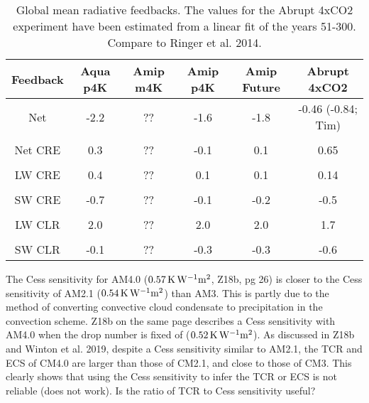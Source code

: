 \documentclass[11pt]{article}   	%
\begin{document}
\begin{table}
\begin{center}
\caption{Global mean radiative feedbacks.  The values for the Abrupt 4xCO2 experiment
have been estimated from a linear fit of the years 51-300.  Compare to Ringer et al. 2014.}
    \begin{tabular}{*{6}{c}}
    \hline
    \hline
 Feedback & Aqua p4K & Amip m4K & Amip p4K & Amip Future & Abrupt 4xCO2    \\ \hline
    Net          &   -2.2  & ??  &  -1.6              & -1.8           &    -0.46 (-0.84; Tim)         \\ 
    \\
    Net CRE      & 0.3   & ??  & -0.1            & 0.1           & 0.65   \\  
    \\
    LW CRE       & 0.4   & ??  & 0.1            & 0.1           & 0.14    \\  
    \\
    SW CRE      & -0.7  & ?? & -0.1          & -0.2          & -0.5              \\  
    \\
    LW CLR       & 2.0   & ?? & 2.0             & 2.0           & 1.7             \\  
    \\
    SW CLR      & -0.1  & ?? & -0.3            & -0.3          & -0.6                   \\  \hline

    \end{tabular}\par
    \label{tab:lambda}
\end{center}
\end{table}

The Cess sensitivity for AM4.0 ($0.57 \, \rm{K\, W^{-1} m^2}$, Z18b, pg 26) is closer to the Cess sensitivity 
of AM2.1 ($0.54 \, \rm{K\, W^{-1} m^2}$) than AM3.  This is partly due to the method of converting convective cloud condensate to precipitation 
in the convection scheme.   Z18b on the same page describes a Cess sensitivity with AM4.0 when the drop number
is fixed of ($0.52 \, \rm{K\, W^{-1} m^2}$).  As discussed in Z18b and Winton et al. 2019, despite a Cess sensitivity similar to AM2.1, 
the TCR and ECS of CM4.0 are larger than those of CM2.1, and close to those of CM3.   This clearly 
shows that using the Cess sensitivity to infer the TCR or ECS is not reliable (does not work).   Is the ratio of TCR to
Cess sensitivity useful?  
\end{document}
